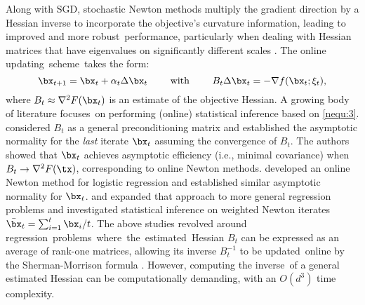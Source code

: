 Along with SGD, stochastic Newton methods multiply the gradient direction by a Hessian inverse to incorporate the objective's curvature information, leading to improved and more robust~performance, particularly when dealing with Hessian matrices that have eigenvalues on significantly different scales \citep{Byrd2016Stochastic, Kovalev2019Stochastic, Bercu2020Efficient}. The online \mbox{updating}~scheme~takes the form:
\begin{equation}\label{nequ:3}
\bx_{t+1} = \bx_t + \alpha_t \Delta\bx_t \quad\quad \text{ with }\quad\quad B_t\Delta\bx_t = - \nabla f(\bx_t; \xi_t),
\end{equation}
where $B_t\approx \nabla^2 F(\bx_t)$ is an estimate of the objective Hessian. 
A growing body of literature focuses~on performing (online) statistical inference based on \eqref{nequ:3}. \cite{Leluc2023Asymptotic} considered $B_t$ as a general preconditioning matrix and established the asymptotic normality for the \textit{last} iterate $\bx_t$ assuming the convergence of $B_t$. The authors showed that $\bx_t$ achieves asymptotic efficiency (i.e., minimal covariance) when $B_t \rightarrow \nabla^2 F(\tx)$, corresponding to online Newton methods.
\cite{Bercu2020Efficient} developed an online Newton method for logistic regression and established similar asymptotic normality for $\bx_t$. 
\cite{Cenac2020efficient} and \cite{Boyer2022asymptotic} expanded that approach to more general regression problems and investigated statistical inference on weighted Newton iterates $\bar{\bx}_t = \sum_{i=1}^{t} \bx_i/t$. The above studies revolved around regression~\mbox{problems}~where~the~\mbox{estimated}~Hessian $B_t$ can be expressed as an average of rank-one matrices, allowing its inverse $B_t^{-1}$ to be updated~online by the Sherman-Morrison formula \citep{Sherman1950Adjustment}. However, computing the inverse~of a general estimated Hessian can be computationally demanding, with an $O(d^3)$ time complexity.\quad\quad\quad


